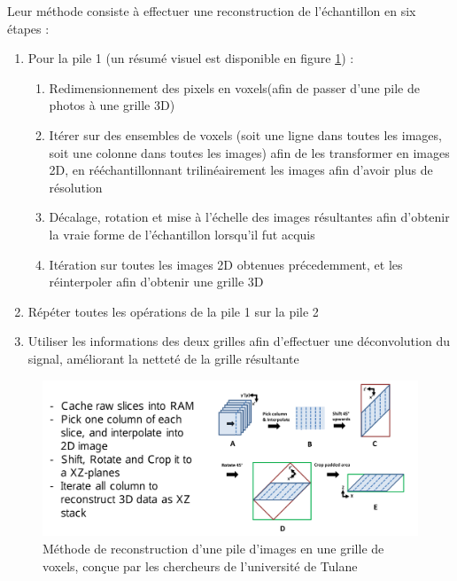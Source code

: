 \documentclass[utf8]{stageM2R}
\begin{document}
{{			Leur méthode consiste à effectuer une reconstruction de l'échantillon en six étapes :

			\begin{enumerate}
				\item Pour la pile 1 (un résumé visuel est disponible en figure \ref{ref_tulane_recon_01_shift_up}) :
				\begin{enumerate}
					\item Redimensionnement des pixels en voxels\footnotemark (afin de passer d'une pile de photos à une grille 3D)
					\item Itérer sur des ensembles de voxels (soit une ligne dans toutes les images, soit une colonne dans toutes les images) afin de les transformer en images 2D, en rééchantillonnant trilinéairement les images afin d'avoir plus de résolution
					\item \label{itm:wrong_shift}Décalage, rotation et mise à l'échelle des images résultantes afin d'obtenir la vraie forme de l'échantillon lorsqu'il fut acquis
					\item Itération sur toutes les images 2D obtenues précedemment, et les réinterpoler afin d'obtenir une grille 3D
				\end{enumerate}
				\item Répéter toutes les opérations de la pile 1 sur la pile 2
				\item Utiliser les informations des deux grilles afin d'effectuer une déconvolution du signal, améliorant la netteté de la grille résultante
			\end{enumerate}

			\begin{figure}[h]
				\centering
				\includegraphics[width=0.8\linewidth]{./img/tulane_reconstruction_01_shift_up.png}
				\caption{Méthode de reconstruction d'une pile d'images en une grille de voxels, conçue par les chercheurs de l'université de Tulane}
				\label{ref_tulane_recon_01_shift_up}
			\end{figure}

}}
\end{document}
